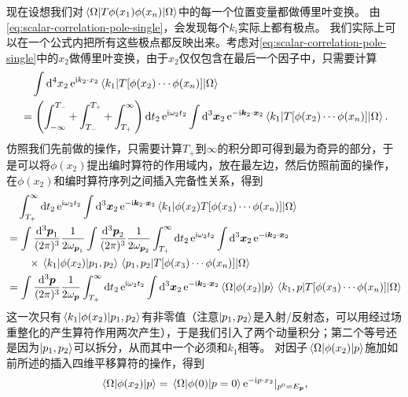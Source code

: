 \documentclass[hyperref, UTF8, a4paper]{ctexart}
\newcommand*{\ii}{\mathrm{i}}
\newcommand*{\ee}{\mathrm{e}}
\begin{document}
现在设想我们对$\mel*{\Omega}{T \phi(x_1) \phi(x_n)}{\Omega}$中的每一个位置变量都做傅里叶变换。
由\eqref{eq:scalar-correlation-pole-single}，会发现每个$k_i$实际上都有极点。
我们实际上可以在一个公式内把所有这些极点都反映出来。考虑对\eqref{eq:scalar-correlation-pole-single}中的$x_2$做傅里叶变换，由于$x_2$仅仅包含在最后一个因子中，只需要计算
\[
    \begin{aligned}
        &\quad \int \dd[4]{x_2} \ee^{\ii k_2 \cdot x_2} \mel*{k_1}{T [\phi(x_2) \cdots \phi(x_n)]}{\Omega} \\
        &= \left( \int_{-\infty}^{T_-} + \int_{T_-}^{T_+} + \int_{T_+}^\infty \right) \dd{t_2} \ee^{\ii \omega_2 t_2} \int \dd[3]{\vb*{x}_2} \ee^{-\ii \vb*{k}_2 \cdot \vb*{x}_2} \mel*{k_1}{T [\phi(x_2) \cdots \phi(x_n)]}{\Omega}.
    \end{aligned}
\]
仿照我们先前做的操作，只需要计算$T_+$到$\infty$的积分即可得到最为奇异的部分，于是可以将$\phi(x_2)$提出编时算符的作用域内，放在最左边，然后仿照前面的操作，在$\phi(x_2)$和编时算符序列之间插入完备性关系，得到
\[
    \begin{aligned}
        &\quad \int_{T_+}^\infty \dd{t_2} \ee^{\ii \omega_2 t_2} \int \dd[3]{\vb*{x}_2} \ee^{-\ii \vb*{k}_2 \cdot \vb*{x}_2} \mel*{k_1}{\phi(x_2) T [\phi(x_3) \cdots \phi(x_n)]}{\Omega} \\
        &= \int \frac{\dd[3]{\vb*{p}_1}}{(2\pi)^3} \frac{1}{2 \omega_{\vb*{p}_1}} \int \frac{\dd[3]{\vb*{p}_2}}{(2\pi)^3} \frac{1}{2 \omega_{\vb*{p}_2}} \int_{T_+}^\infty \dd{t_2} \ee^{\ii \omega_2 t_2} \int \dd[3]{\vb*{x}_2} \ee^{-\ii \vb*{k}_2 \cdot \vb*{x}_2} \\ 
        &\quad \quad \times \mel*{k_1}{\phi(x_2)}{p_1, p_2} \mel*{p_1, p_2}{T [\phi(x_3) \cdots \phi(x_n)]}{\Omega} \\
        &= \int \frac{\dd[3]{\vb*{p}}}{(2\pi)^3} \frac{1}{2 \omega_{\vb*{p}}} \int_{T_+}^\infty \dd{t_2} \ee^{\ii \omega_2 t_2} \int \dd[3]{\vb*{x}_2} \ee^{-\ii \vb*{k}_2 \cdot \vb*{x}_2}  \mel*{\Omega}{\phi(x_2)}{p} \mel*{k_1, p}{T [\phi(x_3) \cdots \phi(x_n)]}{\Omega} \\
    \end{aligned}
\]
这一次只有$\mel*{k_1}{\phi(x_2)}{p_1, p_2}$有非零值（注意$\ket{p_1, p_2}$是入射/反射态，可以用经过场重整化的产生算符作用两次产生），于是我们引入了两个动量积分；第二个等号还是因为$\ket{p_1, p_2}$可以拆分，从而其中一个必须和$k_1$相等。
对因子$\mel*{\Omega}{\phi(x_2)}{p}$施加如前所述的插入四维平移算符的操作，得到
\[
    \mel*{\Omega}{\phi(x_2)}{p} = \mel*{\Omega}{\phi(0)}{p=0} \ee^{-\ii p \cdot x_2}|_{p^0=E_{\vb*{p}}},
\]
\end{document}
